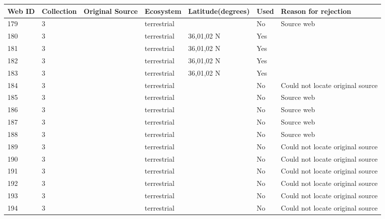\documentclass[12pt]{article}
\begin{document}
\begin{landscape}
        \newpage

    \begin{table}[h!]
    \centering
    {\footnotesize
      \begin{tabular}{p{2.8cm}p{1.3cm}p{5.5cm}p{2.2cm}p{2.5cm}lp{3.5cm}}
        \hline
        Web ID & Collection & Original Source & Ecosystem & Latitude(degrees) & Used  & Reason for rejection  \\
        \hline
        179   & 3 & \citet{Robinson1953}  & terrestrial &       & No    & Source web \\
        180   & 3 & \citet{Savely1939}    & terrestrial & 36,01,02 N & Yes   &       \\
        181   & 3 & \citet{Savely1939}    & terrestrial & 36,01,02 N & Yes   &       \\
        182   & 3 & \citet{Savely1939}    & terrestrial & 36,01,02 N & Yes   &       \\
        183   & 3 & \citet{Savely1939}    & terrestrial & 36,01,02 N & Yes   &       \\
        184   & 3 & \citet{Beaver1972}     & terrestrial &       & No    & Could not locate original source \\
        185   & 3 & \citet{Chapman1955}     & terrestrial &       & No    & Source web \\
        186   & 3 & \citet{Cornaby1974}  & terrestrial &       & No    & Source web \\
        187   & 3 & \citet{Cornaby1974}  & terrestrial &       & No    & Source web \\
        188   & 3 & \citet{Jiron1981}  & terrestrial &       & No    & Source web \\
        189   & 3 & \citet{McKinnerney1978}    & terrestrial &       & No    & Could not locate original source \\
        190   & 3 & \citet{McKinnerney1978}    & terrestrial &       & No    & Could not locate original source \\
        191   & 3 & \citet{McKinnerney1978}    & terrestrial &       & No    & Could not locate original source \\
        192   & 3 & \citet{McKinnerney1978}    & terrestrial &       & No    & Could not locate original source \\
        193   & 3 & \citet{McKinnerney1978}    & terrestrial &       & No    & Could not locate original source \\
        194   & 3 & \citet{McKinnerney1978}    & terrestrial &       & No    & Could not locate original source \\

\end{tabular}}
\end{table}
\end{landscape}
\end{document}
